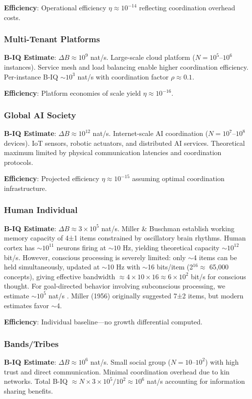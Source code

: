 \documentclass[10pt,conference]{IEEEtran}
\begin{document}
\textbf{Efficiency}: Operational efficiency $\eta \approx 10^{-14}$ reflecting coordination overhead costs.

\subsubsection{Multi-Tenant Platforms}
\textbf{B-IQ Estimate}: $\Delta B \approx 10^9$ nat/s. Large-scale cloud platform ($N = 10^5$--$10^6$ instances). Service mesh and load balancing enable higher coordination efficiency. Per-instance B-IQ $\sim 10^3$ nat/s with coordination factor $\rho \approx 0.1$.

\textbf{Efficiency}: Platform economies of scale yield $\eta \approx 10^{-16}$.

\subsubsection{Global AI Society}
\textbf{B-IQ Estimate}: $\Delta B \approx 10^{12}$ nat/s. Internet-scale AI coordination ($N = 10^7$--$10^8$ devices). IoT sensors, robotic actuators, and distributed AI services. Theoretical maximum limited by physical communication latencies and coordination protocols.

\textbf{Efficiency}: Projected efficiency $\eta \approx 10^{-15}$ assuming optimal coordination infrastructure.

\subsubsection{Human Individual}
\textbf{B-IQ Estimate}: $\Delta B \approx 3 \times 10^5$ nat/s. Miller \& Buschman \cite{miller2015} establish working memory capacity of 4±1 items constrained by oscillatory brain rhythms. Human cortex has $\sim 10^{11}$ neurons firing at $\sim 10$ Hz, yielding theoretical capacity $\sim 10^{12}$ bit/s. However, conscious processing is severely limited: only $\sim$4 items can be held simultaneously, updated at $\sim$10 Hz with $\sim$16 bits/item (2$^{16} \approx$ 65,000 concepts), giving effective bandwidth $\approx 4 \times 10 \times 16 \approx 6 \times 10^2$ bit/s for conscious thought. For goal-directed behavior involving subconscious processing, we estimate $\sim 10^5$ nat/s \cite{miller2015}. Miller (1956) originally suggested 7±2 items, but modern estimates favor $\sim$4.

\textbf{Efficiency}: Individual baseline—no growth differential computed.

\subsubsection{Bands/Tribes}
\textbf{B-IQ Estimate}: $\Delta B \approx 10^6$ nat/s. Small social group ($N = 10$--$10^2$) with high trust and direct communication. Minimal coordination overhead due to kin networks. Total B-IQ $\approx N \times 3 \times 10^5 / 10^2 \approx 10^6$ nat/s accounting for information sharing benefits.
\end{document}
